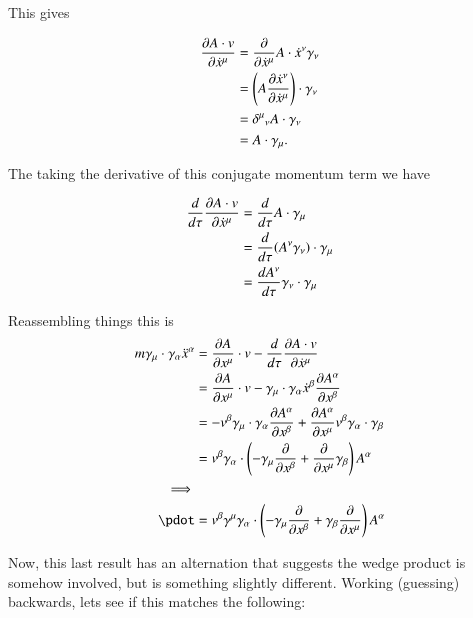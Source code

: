 This gives

\begin{align*}
\PD{\xdot^\mu}{A \cdot v} 
&= \PD{\xdot^\mu}{} A \cdot \xdot^\nu \gamma_\nu \\
&= \left( A \PD{\xdot^\mu}{\xdot^\nu} \right) \cdot \gamma_\nu \\
&= {\delta^\mu}_\nu A \cdot \gamma_\nu \\
&= A \cdot \gamma_\mu.
\end{align*}

The taking the derivative of this conjugate momentum term we have

\begin{align*}
\frac{d}{d\tau} \PD{\xdot^\mu}{A \cdot v} 
&= \frac{d}{d\tau} A \cdot \gamma_\mu \\
&= \frac{d}{d\tau} (A^\nu \gamma_\nu) \cdot \gamma_\mu \\
&= \frac{dA^\nu}{d\tau} \gamma_\nu \cdot \gamma_\mu \\
\end{align*}

Reassembling things this is
\begin{align*}
m \gamma_{\mu} \cdot \gamma_{\alpha} \ddot{x}^{\alpha} &= 
\frac{\partial A}{\partial x^{\mu}} \cdot v -\frac{d}{d\tau} \frac{\partial A \cdot v}{\partial \xdot^{\mu}} \\
&= \frac{\partial A}{\partial x^{\mu}} \cdot v - \gamma_{\mu} \cdot \gamma_{\alpha} \xdot^{\beta} \frac{\partial A^{\alpha}}{\partial x^{\beta}} \\
&= - v^{\beta} \gamma_{\mu} \cdot \gamma_{\alpha} \frac{\partial A^{\alpha}}{\partial x^{\beta}} + \frac{\partial A^{\alpha}}{\partial x^{\mu}} {v}^{\beta} \gamma_{\alpha} \cdot \gamma_{\beta} \\
&= v^{\beta} \gamma_{\alpha} \cdot \left( -\gamma_{\mu} \frac{\partial}{\partial x^{\beta}} + \frac{\partial}{\partial x^{\mu}} \gamma_{\beta} \right) A^{\alpha} \\
\implies \\
\pdot &= v^{\beta} \gamma^{\mu} \gamma_{\alpha} \cdot \left( -\gamma_{\mu} \frac{\partial}{\partial x^{\beta}} + \gamma_{\beta} \frac{\partial}{\partial x^{\mu}} \right) A^{\alpha} \\
\end{align*}

Now, this last result has an alternation that suggests the wedge product is somehow involved, but is something slightly different.  Working (guessing) backwards, lets
see if this matches the following:

